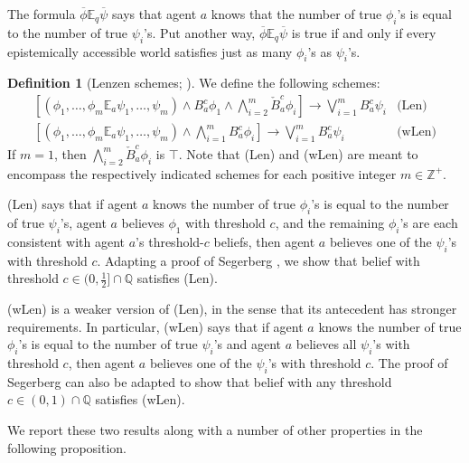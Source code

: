 \documentclass[12pt]{article}
\theoremstyle{definition}
\newtheorem{definition}[theorem]{Definition}
\newcommand{\Rat}{\mathbb{Q}}  %
\newcommand{\Int}{\mathbb{Z}}  %
\begin{document}
The formula $\overline\phi\mathbb{E}_q\overline\psi$ says that agent
$a$ knows that the number of true $\phi_i$'s is equal to the number of
true $\psi_i$'s.  Put another way,
$\overline\phi\mathbb{E}_q\overline\psi$ is true if and only if every
epistemically accessible world satisfies just as many $\phi_i$'s as
$\psi_i$'s.

\begin{definition}[Lenzen schemes; \cite{Lenzen2003:kbasp}]
  \label{definition:lenzen-schemes}
  We define the following schemes:
  \[
  \begin{array}{cl}
    \textstyle [(\phi_1,\dots,\phi_m\mathbb{E}_a\psi_1,\dots,\psi_m)
    \land B_a^c\phi_1 \land \bigwedge_{i=2}^m \check B_a^c\phi_i] \to
    \bigvee_{i=1}^m B_a^c\psi_i
    &
    \text{(Len)}
    \\[1em]
    \textstyle [(\phi_1,\dots,\phi_m\mathbb{E}_a\psi_1,\dots,\psi_m)
    \land \bigwedge_{i=1}^m B_a^c\phi_i] \to
    \bigvee_{i=1}^m B_a^c\psi_i
    &
    \text{(wLen)}
  \end{array}
  \]
  If $m=1$, then $\bigwedge_{i=2}^m \check B_a^c\phi_i$ is $\top$.
  Note that (Len) and (wLen) are meant to encompass the respectively
  indicated schemes for each positive integer $m\in\Int^+$.
\end{definition}

(Len) says that if agent $a$ knows the number of true $\phi_i$'s is
equal to the number of true $\psi_i$'s, agent $a$ believes $\phi_1$
with threshold $c$, and the remaining $\phi_i$'s are each consistent
with agent $a$'s threshold-$c$ beliefs, then agent $a$ believes one of
the $\psi_i$'s with threshold $c$.  Adapting a proof of Segerberg
\cite{Segerberg1971:qpiams}, we show that belief with threshold
$c\in(0,\frac 12]\cap\Rat$ satisfies (Len).

(wLen) is a weaker version of (Len), in the sense that its antecedent
has stronger requirements.  In particular, (wLen) says that if agent
$a$ knows the number of true $\phi_i$'s is equal to the number of true
$\psi_i$'s and agent $a$ believes all $\psi_i$'s with threshold $c$,
then agent $a$ believes one of the $\psi_i$'s with threshold $c$.  The
proof of Segerberg can also be adapted to show that belief with any
threshold $c\in(0,1)\cap\Rat$ satisfies (wLen).

We report these two results along with a number of other properties
in the following proposition.
\end{document}
